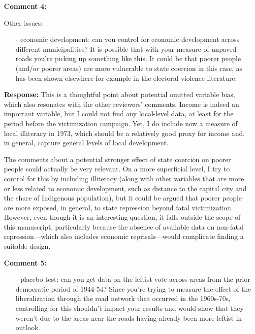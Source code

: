 \documentclass[12pt, a4paper, notitlepage]{article}
\begin{document}
\vspace{15pt}
\noindent\textbf{Comment 4:}
\begin{displayquote}
Other issues:

\begin{itemize}
\item[-] economic development: can you control for economic development across different municipalities? It is possible that with your measure of unpaved roads you’re picking up something like this. It could be that poorer people (and/or poorer areas) are more vulnerable to state coercion in this case, as has been shown elsewhere for example in the electoral violence literature.
\end{itemize}
\end{displayquote}

\noindent\textbf{Response:} This is a thoughtful point about potential omitted variable bias, which also resonates with the other reviewers' comments. Income is indeed an important variable, but I could not find any local-level data, at least for the period before the victimization campaign. Yet, I do include now a measure of local illiteracy in 1973, which should be a relatively good proxy for income and, in general, capture general levels of local development.

The comments about a potential stronger effect of state coercion on poorer people could actually be very relevant. On a more superficial level, I try to control for this by including illiteracy (along with other variables that are more or less related to economic development, such as distance to the capital city and the share of Indigenous population), but it could be argued that poorer people are more exposed, in general, to state repression beyond fatal victimization. However, even though it is an interesting question, it falls outside the scope of this manuscript, particularly because the absence of available data on non-fatal repression---which also includes economic reprisals---would complicate finding a suitable design.

\vspace{15pt}
\noindent\textbf{Comment 5:}
\begin{displayquote}
\begin{itemize}
\item[-] placebo test: can you get data on the leftist vote across areas from the prior democratic period of 1944-54? Since you’re trying to measure the effect of the liberalization through the road network that occurred in the 1960s-70s, controlling for this shouldn’t impact your results and would show that they weren’t due to the areas near the roads having already been more leftist in outlook.
\end{itemize}
\end{displayquote}
\end{document}
